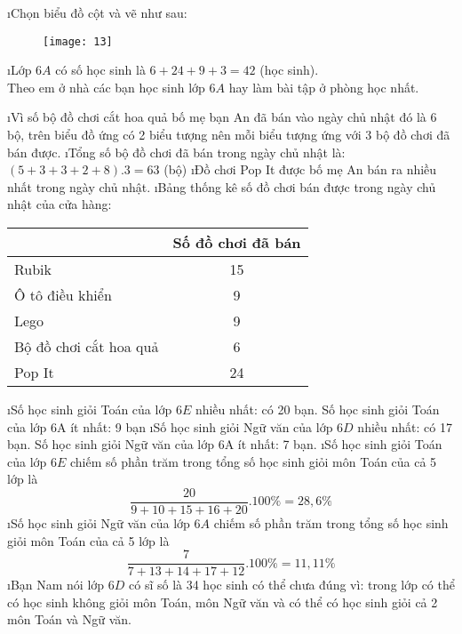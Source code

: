 \begin{Answer}{15}
		\begin{enumerate}[a),leftmargin=*]
			\i Chọn biểu đồ cột và vẽ như sau:
			\begin{figure}[H]
				\centering
				\vspace*{-5pt}
				\captionsetup{labelformat= empty, justification=centering}
				\texttt{[image: 13]}
				\vspace*{-10pt}
			\end{figure}
			\i Lớp $6A$ có số học sinh là $6 + 24 + 9 + 3 = 42$  (học sinh).\\
			Theo em ở nhà các bạn học sinh lớp $6A$ hay làm bài tập ở phòng học nhất.
		\end{enumerate}
	
\end{Answer}
\begin{Answer}{16}
		\begin{enumerate}[a),leftmargin=*]
			\i Vì số bộ đồ chơi cắt hoa quả bố mẹ bạn An đã bán vào ngày chủ nhật đó là 6 bộ, trên biểu đồ ứng có 2 biểu tượng nên mỗi biểu tượng  ứng với 3 bộ đồ chơi đã bán được.
			\i Tổng số bộ đồ chơi đã bán trong ngày chủ nhật là: $\left( {5 + 3 + 3 + 2 + 8} \right).3 = 63$  (bộ)
			\i Đồ chơi Pop It được bố mẹ An bán ra nhiều nhất trong ngày chủ nhật.
			\i Bảng thống kê số đồ chơi bán được trong ngày chủ nhật của cửa hàng:
			\begin{center}
				\begin{tabular}{|l|c|}
					\hline
					&Số đồ chơi đã bán\\
					\hline
					Rubik&	15\\
					\hline
					Ô tô điều khiển&	9\\
					\hline
					Lego&	9\\
					\hline
					Bộ đồ chơi cắt hoa quả&	6\\
					\hline
					Pop It&	24\\
					\hline
				\end{tabular}
			\end{center}
		\end{enumerate}
	
\end{Answer}
\begin{Answer}{17}
		\begin{enumerate}[a),leftmargin=*]
			\i Số học sinh giỏi Toán của lớp $6E$ nhiều nhất: có 20 bạn. Số học sinh giỏi Toán của lớp 6A ít nhất: 9 bạn
			\i Số học sinh giỏi Ngữ văn của lớp $6D$ nhiều nhất: có 17 bạn. Số học sinh giỏi Ngữ văn của lớp 6A ít nhất: 7 bạn.
			\i Số học sinh giỏi Toán của lớp $6E$ chiếm số phần trăm trong tổng số học sinh giỏi môn Toán của cả 5 lớp là
			\[\dfrac{{20}}{{9 + 10 + 15 + 16 + 20}}.100\%  = 28,6\%\]
			\i Số học sinh giỏi Ngữ văn của lớp $6A$ chiếm số phần trăm trong tổng số học sinh giỏi môn Toán của cả 5 lớp là
			\[\dfrac{7}{{7 + 13 + 14 + 17 + 12}}.100\%  = 11,11\%\]
			\i Bạn Nam nói lớp $6D$ có sĩ số là 34 học sinh có thể chưa đúng vì: trong lớp có thể có học sinh không giỏi môn Toán, môn Ngữ văn và có thể có học sinh giỏi cả 2 môn Toán và Ngữ văn.
		\end{enumerate}
	
\end{Answer}
